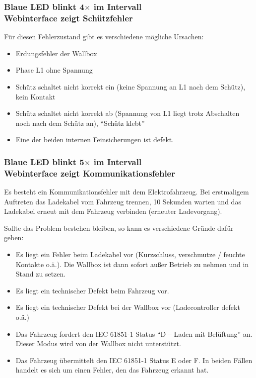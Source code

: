 \documentclass[a4paper,10pt]{article}
\begin{document}
\begin{multicols*}{2}
	\subsubsection*{Blaue LED blinkt 4$\times$ im Intervall \\ Webinterface zeigt Schützfehler}
	Für diesen Fehlerzustand gibt es verschiedene mögliche Ursachen:
	\begin{itemize}
		\item Erdungsfehler der Wallbox
		\item Phase L1 ohne Spannung
		\item Schütz schaltet nicht korrekt ein (keine Spannung an L1 nach dem Schütz), kein
		      Kontakt
		\item Schütz schaltet nicht korrekt ab (Spannung von L1 liegt trotz Abschalten noch
		      nach dem Schütz an), \enquote{Schütz klebt}
		\item Eine der beiden internen Feinsicherungen ist defekt.
	\end{itemize}

	\subsubsection*{Blaue LED blinkt 5$\times$ im Intervall \\ Webinterface zeigt Kommunikationsfehler}
	Es besteht ein Kommunikationsfehler mit dem Elektrofahrzeug. Bei erstmaligem
	Auftreten das Ladekabel vom Fahrzeug trennen, 10 Sekunden warten und das
	Ladekabel erneut mit dem Fahrzeug verbinden (erneuter Ladevorgang).

	Sollte das Problem bestehen bleiben, so kann es verschiedene Gründe dafür
	geben:
	\begin{itemize}
		\item Es liegt ein Fehler beim Ladekabel vor (Kurzschluss, verschmutze / feuchte
		      Kontakte o.ä.). Die Wallbox ist dann sofort außer Betrieb zu nehmen und
		      in Stand zu setzen.
		\item Es liegt ein technischer Defekt beim Fahrzeug vor.
		\item Es liegt ein technischer Defekt bei der Wallbox vor (Ladecontroller defekt o.ä.)
		\item Das Fahrzeug fordert den IEC 61851-1 Status \enquote{D – Laden mit Belüftung}
		      an. Dieser Modus wird von der Wallbox nicht unterstützt.
		\item Das Fahrzeug übermittelt den IEC 61851-1 Status E oder F. In beiden Fällen
		      handelt es sich um einen Fehler, den das Fahrzeug erkannt hat.
	\end{itemize}


\end{multicols*}
\end{document}
